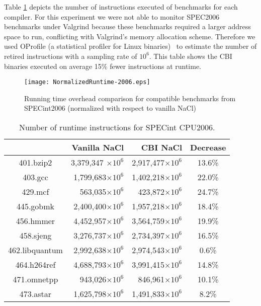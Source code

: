 \documentclass[conference]{IEEEtran}
\begin{document}
Table \ref{tab:insn2006} depicts the number of instructions executed  of benchmarks for each compiler. For this experiment we were not able to monitor SPEC2006 benchmarks under Valgrind because these benchmarks required a larger address space to run, conflicting with Valgrind's memory allocation scheme. Therefore we used OProfile (a statistical profiler for Linux binaries)~\cite{OProfile} to estimate the number of retired instructions with a sampling rate of $10^6$. This table shows the CBI binaries executed on average 15\% fewer instructions at runtime.


\begin{figure*}[!t]
\centering
\texttt{[image: NormalizedRuntime-2006.eps]}
\caption{Running time overhead comparison for compatible benchmarks
from SPECint2006 (normalized with respect to vanilla NaCl)}
\label{fig:runtime2006}
\end{figure*}





\begin{table}
\centering
\caption{Number of runtime instructions for SPECint CPU2006.}
\label{tab:insn2006}
\begin{tabular}{|c||r|r|c|} \hline
&\textbf{Vanilla NaCl}&\textbf{CBI NaCl}& \!\small{Decrease}\!\! \\ \hline  \hline    
401.bzip2&3,379,347 $\times 10^6$&2,917,477$\times 10^6$&13.6\%\\ \hline
403.gcc&1,799,683$\times 10^6$&1,402,218$\times 10^6$&22.0\%\\ \hline
429.mcf&563,035$\times 10^6$&423,872$\times 10^6$&24.7\%\\ \hline
445.gobmk&2,400,400$\times 10^6$&1,957,218$\times 10^6$&18.4\%\\ \hline
456.hmmer&4,452,957$\times 10^6$&3,564,759$\times 10^6$&19.9\%\\ \hline
458.sjeng&3,276,737$\times 10^6$&2,734,397$\times 10^6$&16.5\%\\ \hline
462.libquantum&2,992,638$\times 10^6$&2,974,543$\times 10^6$&0.6\%\\ \hline
464.h264ref&4,688,793$\times 10^6$&3,991,415$\times 10^6$&14.8\%\\ \hline
471.omnetpp&943,026$\times 10^6$&846,961$\times 10^6$&10.1\%\\ \hline
473.astar&1,625,798$\times 10^6$&1,491,833$\times 10^6$&8.2\%\\ \hline

\end{tabular}
\end{table}
\end{document}
